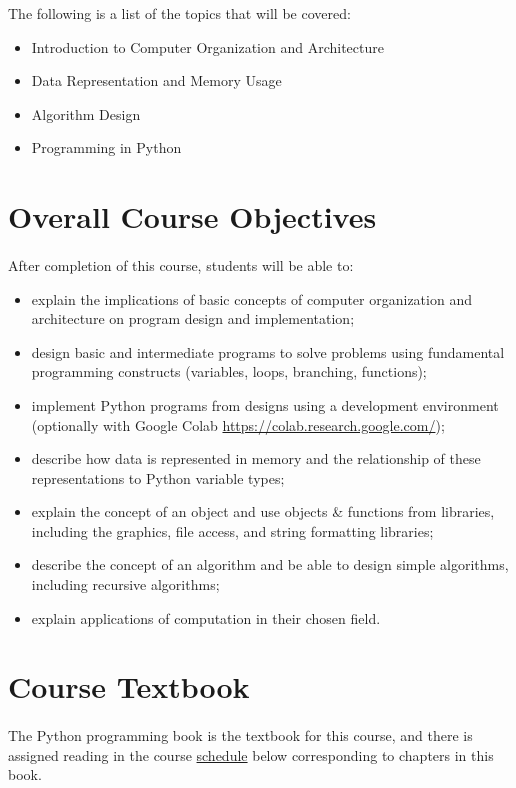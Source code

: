 \documentclass[letter,10pt]{article}
\begin{document}
The following is a list of the topics that will be covered:
\begin{itemize}
\item Introduction to Computer Organization and Architecture
\item Data Representation and Memory Usage
\item Algorithm Design
\item Programming in Python
\end{itemize}

\section*{Overall Course Objectives}
\paragraph{}After completion of this course, students will be able to:
\begin{itemize}
    \item explain the implications of basic concepts of computer organization and architecture on program design and implementation;
    \item design basic and intermediate programs to solve problems using fundamental programming constructs (variables, loops, branching, functions);
    \item implement Python programs from designs using a development environment (optionally with Google Colab \url{https://colab.research.google.com/});
    \item describe how data is represented in memory and the relationship of these representations to Python variable types;
    \item explain the concept of an object and use objects \& functions from libraries, including the graphics, file access, and string formatting libraries;
    \item describe the concept of an algorithm and be able to design simple algorithms, including recursive algorithms;
    \item explain applications of computation in their chosen field.
\end{itemize}

\section*{Course Textbook}
\paragraph{}The Python programming book is the textbook for this course, and there is assigned reading in the course \hyperlink{sec:sechedule}{schedule} below corresponding to chapters in this book.
\end{document}
